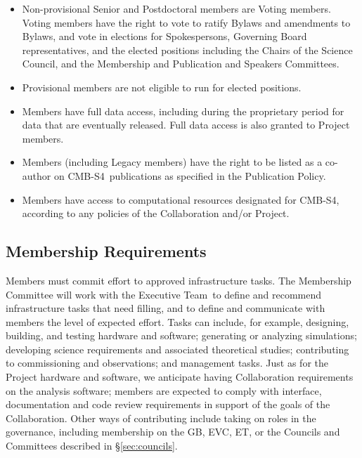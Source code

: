 \documentclass[12pt]{article}
\newcommand{\exec}{{Executive Team}}
\newcommand\collabname{CMB-S4}
\begin{document}
\begin{itemize}

\item Non-provisional Senior and Postdoctoral members are Voting members.  Voting members have the right to vote to ratify Bylaws and amendments to Bylaws, and vote in elections for Spokespersons, Governing Board representatives, and the elected positions including the Chairs of the Science Council, and the Membership and Publication and Speakers Committees.

\item Provisional members are not eligible to run for elected positions.

\item Members have full data access, including during the proprietary period for data that are eventually released. Full data access is also granted to Project members.

\item Members (including Legacy members) have the right to be listed as a co-author on \collabname\ publications as specified in the Publication Policy.

\item Members have access to computational resources designated for \collabname, according to any policies of the Collaboration and/or Project.

\end{itemize}

\subsection{Membership Requirements}

Members must commit effort to approved infrastructure tasks. The Membership Committee will work with the \exec\ to define and recommend infrastructure tasks that need filling, and to define and communicate with members the level of expected effort. Tasks can include, for example, designing, building, and testing hardware and software; generating or analyzing simulations; developing science requirements and associated theoretical studies; contributing to commissioning and observations; and management tasks. Just as for the Project hardware and software, we anticipate having Collaboration requirements on the analysis software; members are expected to comply with interface, documentation and code review requirements in support of the goals of the Collaboration. Other ways of contributing include taking on roles in the governance, including membership on the GB, EVC, ET, or the Councils and Committees described in \S\ref{sec:councils}.
\end{document}
